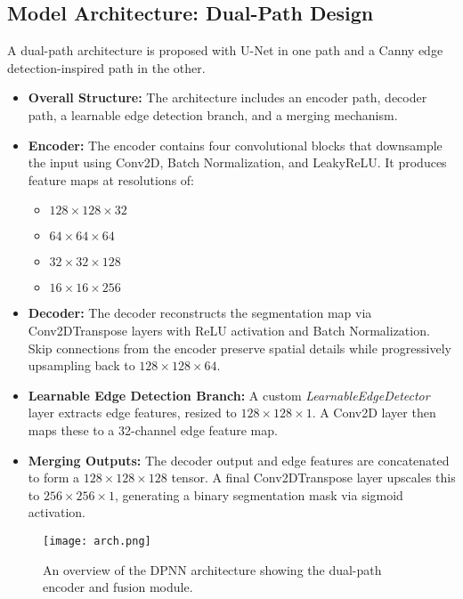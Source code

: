 \documentclass[conference]{IEEEtran}
\begin{document}
\subsection{Model Architecture: Dual-Path Design}

A dual-path architecture is proposed with U-Net in one path and a Canny edge detection-inspired path in the other.

\begin{itemize}
    \item \textbf{Overall Structure:} The architecture includes an encoder path, decoder path, a learnable edge detection branch, and a merging mechanism.
    
    \item \textbf{Encoder:} The encoder contains four convolutional blocks that downsample the input using Conv2D, Batch Normalization, and LeakyReLU. It produces feature maps at resolutions of:
    \begin{itemize}
        \item $128 \times 128 \times 32$
        \item $64 \times 64 \times 64$
        \item $32 \times 32 \times 128$
        \item $16 \times 16 \times 256$
    \end{itemize}
    
    \item \textbf{Decoder:} The decoder reconstructs the segmentation map via Conv2DTranspose layers with ReLU activation and Batch Normalization. Skip connections from the encoder preserve spatial details while progressively upsampling back to $128 \times 128 \times 64$.
    
    \item \textbf{Learnable Edge Detection Branch:} A custom \textit{LearnableEdgeDetector} layer extracts edge features, resized to $128 \times 128 \times 1$. A Conv2D layer then maps these to a 32-channel edge feature map.
    
    \item \textbf{Merging Outputs:} The decoder output and edge features are concatenated to form a $128 \times 128 \times 128$ tensor. A final Conv2DTranspose layer upscales this to $256 \times 256 \times 1$, generating a binary segmentation mask via sigmoid activation.
\end{itemize}
\begin{figure*}[!ht]
  \centering
  \texttt{[image: arch.png]}
  \caption{An overview of the DPNN architecture showing the dual-path encoder and fusion module.}
  \label{fig:dpnn_architecture}
\end{figure*}
\end{document}

